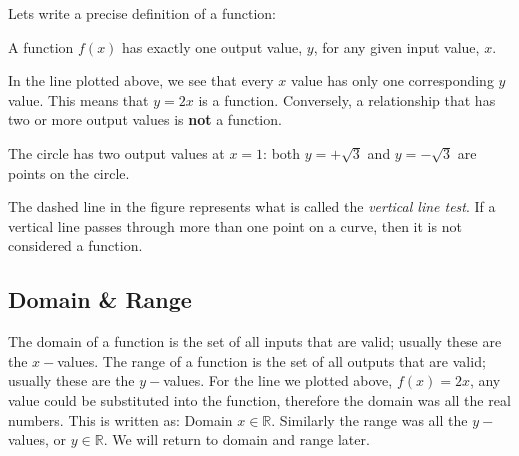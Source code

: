 Lets write a precise definition of a function:
\begin{tcolorbox}\begin{center}
	A function $f(x)$ has exactly one output value, $y$, for any given input value, $x$.
\end{center}\end{tcolorbox}
In the line plotted above, we see that every $x$ value has only one corresponding $y$ value. This means that $y=2x$ is a function. Conversely, a relationship that has two or more output values is \textbf{not} a function. \\ 
\begin{multicols}{2}
	\begin{center}
	\end{center}
\columnbreak
The circle has two output values at $x=1$: both $y=+\sqrt{3}$ and $y=-\sqrt{3}$ are points on the circle.

The dashed line in the figure represents what is called the \textit{vertical line test}. If a vertical line passes through more than one point on a curve, then it is not considered a function.

\subsection*{Domain \& Range}
The domain of a function is the set of all inputs that are valid; usually these are the $x-$values. The range of a function is the set of all outputs that are valid; usually these are the $y-$values. For the line we plotted above, $f(x)=2x$, any value could be substituted into the function, therefore the domain was all the real numbers. This is written as: Domain $x \in \mathbb{R}$. Similarly the range was all the $y-$values, or  $y \in \mathbb{R}$. We will return to domain and range later.
\end{multicols}

